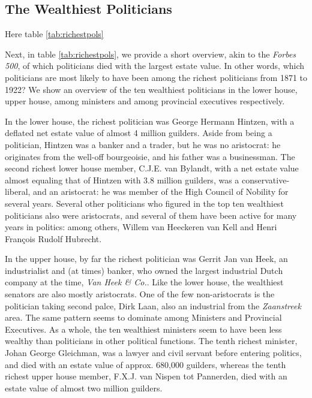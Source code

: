     
\subsection{The Wealthiest Politicians}
    
    \begin{center}
    Here table \ref{tab:richestpols}
    \end{center}

    Next, in table \ref{tab:richestpols}, we provide a short overview, akin to the \textit{Forbes 500}, of which politicians died with the largest estate value. In other words, which politicians are most likely to have been among the richest politicians from 1871 to 1922? We show an overview of the ten wealthiest politicians in the lower house, upper house, among ministers and among provincial executives respectively. 
    
    In the lower house, the richest politician was George Hermann Hintzen, with a deflated net estate value of almost 4 million guilders. Aside from being a politician, Hintzen was a banker and a trader, but he was no aristocrat: he originates from the well-off bourgeoisie, and his father was a businessman. The second richest lower house member, C.J.E. van Bylandt, with a net estate value almost equaling that of Hintzen with 3.8 million guilders, was a conservative-liberal, and an aristocrat: he was member of the High Council of Nobility for several years. Several other politicians who figured in the top ten wealthiest politicians also were aristocrats, and several of them have been active for many years in politics: among others, Willem van Heeckeren van Kell and Henri François Rudolf Hubrecht.
    
    In the upper house, by far the richest politician was Gerrit Jan van Heek, an industrialist and (at times) banker, who owned the largest industrial Dutch company at the time, \textit{Van Heek \& Co.}. Like the lower house, the wealthiest senators are also mostly aristocrats. One of the few non-aristocrats is the politician taking second palce, Dirk Laan, also an industrial from the \textit{Zaanstreek} area. The same pattern seems to dominate among Ministers and Provincial Executives. As a whole, the ten wealthiest ministers seem to have been less wealthy than politicians in other political functions. The tenth richest minister, Johan George Gleichman, was a lawyer and civil servant before entering politics, and died with an estate value of approx. 680,000 guilders, whereas the tenth richest upper house member, F.X.J. van Nispen tot Pannerden, died with an estate value of almost two million guilders. 
    
